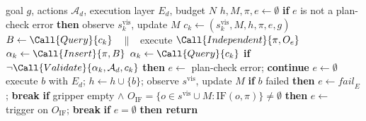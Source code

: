 \begin{algorithm}[t]
\caption{Robust TAMP. $\mathrm{IF}(o,\pi)$: $o$ is not handled by $\pi$ and is either relevant and not
in its goal state, or irrelevant and in the placement area of a region $\pi$ places into.}
\label{alg:robust-tamp}
\small
\begin{algorithmic}[1]
\Require goal $g$, actions $\mathcal{A}_d$, execution layer $E_d$, budget $N$
\State $h, M, \pi, e \gets \emptyset$ 
  \State \textbf{if} $e$ is not a plan-check error \textbf{then} observe $s^{\mathrm{vis}}_k$, update $M$
  \State $c_k \gets (s^{\mathrm{vis}}_k, M, h, \pi, e, g)$
   
    \State $B \gets \Call{Query}{c_k}$ \ $\|$ \ execute $\Call{Independent}{\pi, O_e}$ 
    \State $\alpha_k \gets \Call{Insert}{\pi, B}$ 
  \Else
    \State $\alpha_k \gets \Call{Query}{c_k}$ 
  \EndIf
  \State \textbf{if} $\neg\Call{Validate}{\alpha_k, \mathcal{A}_d, c_k}$ \textbf{then} $e \gets$ plan-check error; \textbf{continue}
  \State $e \gets \emptyset$
    \State execute $b$ with $E_d$; $h \gets h \cup \{b\}$; observe $s^{\mathrm{vis}}$, update $M$
    \State \textbf{if} $b$ failed \textbf{then} $e \gets \mathit{fail}_E$; \textbf{break} 
    \State \textbf{if} gripper empty $\wedge$ $O_{\mathrm{IF}} = \{o \in s^{\mathrm{vis}} \cup M : \mathrm{IF}(o, \pi)\} \neq \emptyset$
      \textbf{then} $e \gets$ trigger on $O_{\mathrm{IF}}$; \textbf{break}
  \EndFor
  \State \textbf{if} $e = \emptyset$ \textbf{then return} 
\EndFor
\end{algorithmic}
\end{algorithm}
